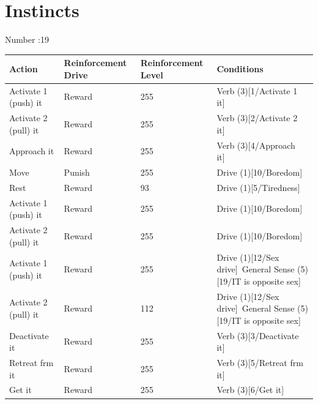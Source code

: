 \documentclass{article}
\begin{document}
\newpage

\section*{Instincts}

Number :19

\begin{longtable}{|p{3cm}|p{3cm}|p{3cm}|p{8cm}|}
\hline
{\bf Action} & {\bf Reinforcement Drive} & {\bf Reinforcement Level} & {\bf Conditions} \\ \hline
Activate 1 (push) it & Reward & 255 & Verb (3)[1/Activate 1 it]~\newline  \\ \hline
Activate 2 (pull) it & Reward & 255 & Verb (3)[2/Activate 2 it]~\newline  \\ \hline
Approach it & Reward & 255 & Verb (3)[4/Approach it]~\newline  \\ \hline
Move & Punish & 255 & Drive (1)[10/Boredom]~\newline  \\ \hline
Rest & Reward & 93 & Drive (1)[5/Tiredness]~\newline  \\ \hline
Activate 1 (push) it & Reward & 255 & Drive (1)[10/Boredom]~\newline  \\ \hline
Activate 2 (pull) it & Reward & 255 & Drive (1)[10/Boredom]~\newline  \\ \hline
Activate 1 (push) it & Reward & 255 & Drive (1)[12/Sex drive]~\newline General Sense (5)[19/IT is opposite sex]~\newline  \\ \hline
Activate 2 (pull) it & Reward & 112 & Drive (1)[12/Sex drive]~\newline General Sense (5)[19/IT is opposite sex]~\newline  \\ \hline
Deactivate it & Reward & 255 & Verb (3)[3/Deactivate it]~\newline  \\ \hline
Retreat frm it & Reward & 255 & Verb (3)[5/Retreat frm it]~\newline  \\ \hline
Get it & Reward & 255 & Verb (3)[6/Get it]~\newline  \\ \hline

\end{longtable}
\end{document}
